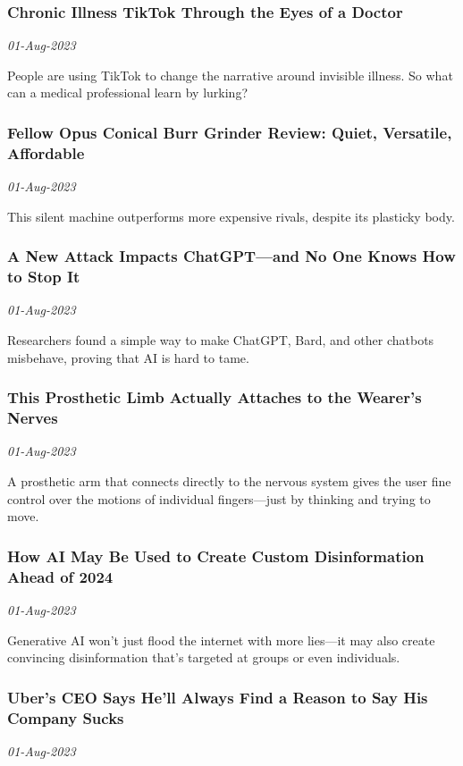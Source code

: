 \subsubsection{Chronic Illness TikTok Through the Eyes of a Doctor \href{https://www.wired.com/story/chronic-illness-tiktok-medicine/}{}}
\textit{01-Aug-2023}

People are using TikTok to change the narrative around invisible illness. So what can a medical professional learn by lurking?
\subsubsection{Fellow Opus Conical Burr Grinder Review: Quiet, Versatile, Affordable \href{https://www.wired.com/review/fellow-opus-conical-burr-grinder/}{}}
\textit{01-Aug-2023}

This silent machine outperforms more expensive rivals, despite its plasticky body.
\subsubsection{A New Attack Impacts ChatGPT—and No One Knows How to Stop It \href{https://www.wired.com/story/ai-adversarial-attacks/}{}}
\textit{01-Aug-2023}

Researchers found a simple way to make ChatGPT, Bard, and other chatbots misbehave, proving that AI is hard to tame.
\subsubsection{This Prosthetic Limb Actually Attaches to the Wearer’s Nerves \href{https://www.wired.com/story/this-prosthetic-limb-actually-attaches-to-the-wearers-nerves/}{}}
\textit{01-Aug-2023}

A prosthetic arm that connects directly to the nervous system gives the user fine control over the motions of individual fingers—just by thinking and trying to move.
\subsubsection{How AI May Be Used to Create Custom Disinformation Ahead of 2024 \href{https://www.wired.com/story/generative-ai-custom-disinformation/}{}}
\textit{01-Aug-2023}

Generative AI won't just flood the internet with more lies—it may also create convincing disinformation that's targeted at groups or even individuals.
\subsubsection{Uber’s CEO Says He’ll Always Find a Reason to Say His Company Sucks \href{https://www.wired.com/story/uber-ceo-will-always-say-his-company-sucks/}{}}
\textit{01-Aug-2023}

